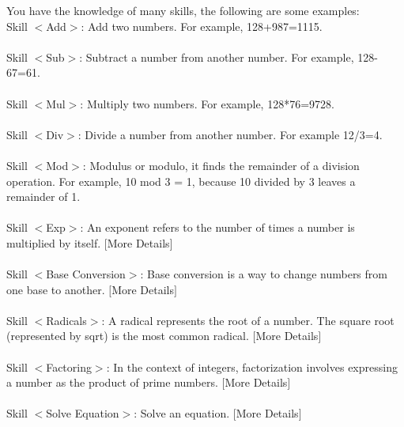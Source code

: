 \documentclass{article} %
\begin{document}
\begin{tcolorbox}[title = {Skills for MATH}, colback = Apricot!25!white, colframe = BrickRed!75!black,fontupper =\fontsize{7.5pt}{6pt}\selectfont] 
You have the knowledge of many skills, the following are some examples: \\
Skill $<$Add$>$: Add two numbers. For example, 128+987=1115.  \\ \\

Skill $<$Sub$>$: Subtract a number from another number. For example, 128-67=61.   \\ \\

Skill $<$Mul$>$: Multiply two numbers. For example, 128*76=9728.   \\ \\

Skill $<$Div$>$: Divide a number from another number. For example 12/3=4.  \\ \\

Skill $<$Mod$>$: Modulus or modulo, it finds the remainder of a division operation. For example, 10 mod 3 = 1, because 10 divided by 3 leaves a remainder of 1.  \\ \\

Skill $<$Exp$>$: An exponent refers to the number of times a number is multiplied by itself.  $[$More Details$]$ \\ \\

Skill $<$Base Conversion$>$: Base conversion is a way to change numbers from one base to another.   $[$More Details$]$\\ \\

Skill $<$Radicals$>$: A radical represents the root of a number. The square root (represented by sqrt) is the most common radical. $[$More Details$]$\\ \\


Skill $<$Factoring$>$: In the context of integers, factorization involves expressing a number as the product of prime numbers. $[$More Details$]$\\ \\

Skill $<$Solve Equation$>$: Solve an equation.   $[$More Details$]$\\ \\


\end{tcolorbox}
\end{document}

